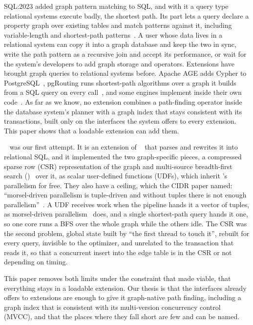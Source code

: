 SQL:2023 added graph pattern matching to SQL, and with it a query type relational systems execute badly, the shortest path. Its \sqlpgq part lets a query declare a property graph over existing tables and match
patterns against it, including variable-length and shortest-path patterns~\cite{deutsch2022gql}. A user whose data
lives in a relational system can copy it into a graph database and keep the two in sync, write the path pattern as a
recursive join and accept its performance, or wait for the system's developers to add graph storage and operators.
Extensions have brought graph queries to relational systems before. Apache AGE adds Cypher to
PostgreSQL~\cite{apacheage}, pgRouting runs shortest-path algorithms over a graph it builds from a SQL query on every
call~\cite{pgrouting}, and some engines implement \sqlpgq inside their own code~\cite{oraclesqlpgq}. As far as we
know, no extension combines a path-finding operator inside the database system's planner with a graph index that stays
consistent with its transactions, built only on the interfaces the system offers to every extension. This paper
shows that a loadable extension can add them.

\duckpgq~\cite{tenwolde2023duckpgq} was our first attempt. It is an extension of \duckdb~\cite{duckdb2019,raasveldt2020duckdb} that
parses \sqlpgq and rewrites it into relational SQL, and it implemented the two graph-specific pieces, a compressed
sparse row (CSR) representation of the graph and multi-source breadth-first search (\msbfs)~\cite{then2014msbfs} over
it, as scalar user-defined functions (UDFs), which inherit \duckdb's parallelism for free. They also have a ceiling, which the CIDR
paper named: ``morsel-driven parallelism is tuple-driven and without tuples there is not enough
parallelism''~\cite{tenwolde2023duckpgq}. A UDF receives work when the pipeline hands it a vector of tuples, as morsel-driven parallelism~\cite{leis2014morsel} does, and a
single shortest-path query hands it one, so one core runs a BFS over the whole graph while the others idle. The CSR
was the second problem, global state built by ``the first thread to touch it'', rebuilt for every query, invisible to
the optimizer, and unrelated to the transaction that reads it, so that a concurrent insert into the edge table is in the CSR or not depending on timing.

This paper removes both limits under the constraint that made \duckpgq viable, that everything stays in a
loadable extension. Our thesis is that the interfaces \duckdb already offers to extensions are enough to give it
graph-native path finding, including a graph index that is consistent with its multi-version concurrency control
(MVCC), and that the places where they fall short are few and can be named.


